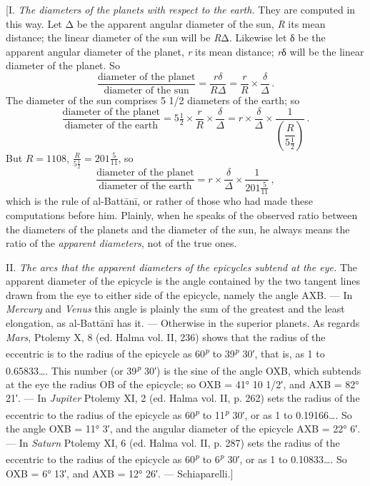 \documentclass[11pt]{article}
\newcommand{\Pg}[1]{\marginpar{\footnotesize\color{gray}#1}}
\begin{document}
\par \Pg{I 290}[I. \emph{The diameters of the planets with respect to the earth.} They are computed in this way. Let {\greekfont Δ} be the apparent angular diameter of the sun, \emph{R} its mean distance; the linear diameter of the sun will be \emph{R}{\greekfont Δ}. Likewise let {\greekfont δ} be the apparent angular diameter of the planet, \emph{r} its mean distance; \emph{r}{\greekfont δ} will be the linear diameter of the planet. So \[ \frac{\text{diameter of the planet}}{\text{diameter of the sun}} = \frac{r\delta}{R\Delta} = \frac{r}{R} \times \frac{\delta}{\Delta}\,. \] The diameter of the sun comprises 5 1/2 diameters of the earth; so \[ \frac{\text{diameter of the planet}}{\text{diameter of the earth}} = 5\tfrac{1}{2} \times \frac{r}{R} \times \frac{\delta}{\Delta} = r \times \frac{\delta}{\Delta} \times \frac{1}{\left(\dfrac{R}{5\frac{1}{2}}\right)}\,. \] But $R = 1108$, $\frac{R}{5\frac{1}{2}} = 201\tfrac{5}{11}$, so \[ \frac{\text{diameter of the planet}}{\text{diameter of the earth}} = r \times \frac{\delta}{\Delta} \times \frac{1}{201\frac{5}{11}}\,, \] which is the rule of al-Battānī, or rather of those who had made these computations before him. Plainly, when he speaks of the observed ratio between the diameters of the planets and the diameter of the sun, he always means the ratio of the \emph{apparent diameters}, not of the true ones.\par
\par II. \emph{The arcs that the apparent diameters of the epicycles subtend at the eye.} The apparent diameter of the epicycle is the angle contained by the two tangent lines drawn from the eye to either side of the epicycle, namely the angle AXB. — In \emph{Mercury} and \emph{Venus} this angle is plainly the sum of the greatest and the least elongation, as al-Battānī has it. — Otherwise in the superior planets. As regards \emph{Mars}, Ptolemy X, 8 (ed. Halma vol. II, 236) shows that the radius of the eccentric is to the radius of the epicycle as 60\textsuperscript{\itshape p} to 39\textsuperscript{\itshape p} 30′, that is, as 1 to 0.65833…. This number (or 39\textsuperscript{\itshape p} 30′) is the sine of the angle OXB, which subtends at the eye the radius OB of the epicycle; so OXB = 41° 10 1/2′, and AXB = 82° 21′. — In \emph{Jupiter} Ptolemy XI, 2 (ed. Halma vol. II, p. 262) sets the radius of the eccentric to the radius of the epicycle as 60\textsuperscript{\itshape p} to 11\textsuperscript{\itshape p} 30′, or as 1 to 0.19166…. So the angle OXB = 11° 3′, and the angular diameter of the epicycle AXB = 22° 6′. — In \emph{Saturn} Ptolemy XI, 6 (ed. Halma vol. II, p. 287) sets the radius of the eccentric to the radius of the epicycle as 60\textsuperscript{\itshape p} to 6\textsuperscript{\itshape p} 30′, or as 1 to 0.10833…. So OXB = 6° 13′, and AXB = 12° 26′. — Schiaparelli.]\par
\end{document}
